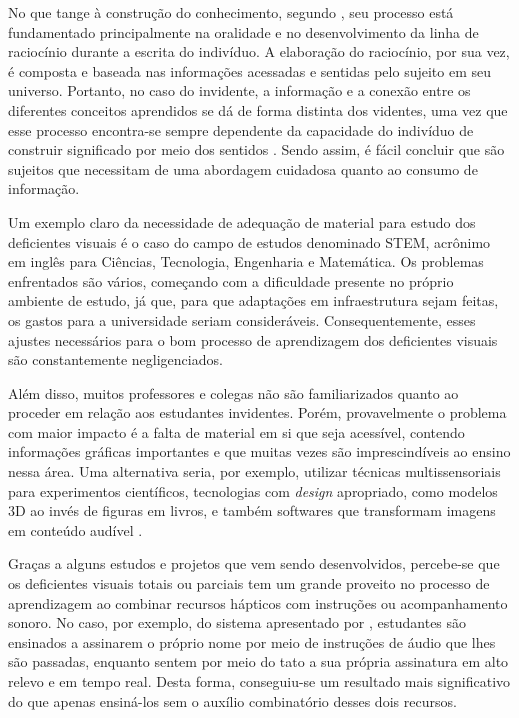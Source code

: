 No que tange à construção do conhecimento, segundo , seu processo está fundamentado principalmente na oralidade e no desenvolvimento da linha de raciocínio durante a escrita do indivíduo. A elaboração do raciocínio, por sua vez, é composta e baseada nas informações acessadas e sentidas pelo sujeito em seu universo. Portanto, no caso do invidente, a informação e a conexão entre os diferentes conceitos aprendidos se dá de forma distinta dos videntes, uma vez que esse processo encontra-se sempre dependente da capacidade do indivíduo de construir significado por meio dos sentidos . Sendo assim, é fácil concluir que são sujeitos que necessitam de uma abordagem cuidadosa quanto ao consumo de informação.

Um exemplo claro da necessidade de adequação de material para estudo dos deficientes visuais é o caso do campo de estudos denominado STEM, acrônimo em inglês para Ciências, Tecnologia, Engenharia e Matemática. Os problemas enfrentados são vários, começando com a dificuldade presente no próprio ambiente de estudo, já que, para que adaptações em infraestrutura sejam feitas, os gastos para a universidade seriam consideráveis. Consequentemente, esses ajustes necessários para o bom processo de aprendizagem dos deficientes visuais são constantemente negligenciados.

Além disso, muitos professores e colegas não são familiarizados quanto ao proceder em relação aos estudantes invidentes. Porém, provavelmente o problema com maior impacto é a falta de material em si que seja acessível, contendo informações gráficas importantes e que muitas vezes são imprescindíveis ao ensino nessa área. Uma alternativa seria, por exemplo, utilizar técnicas multissensoriais para experimentos científicos, tecnologias com \textit{design} apropriado, como modelos 3D ao invés de figuras em livros, e também softwares que transformam imagens em conteúdo audível .

Graças a alguns estudos e projetos que vem sendo desenvolvidos, percebe-se que os deficientes visuais totais ou parciais tem um grande proveito no processo de aprendizagem ao combinar recursos hápticos com instruções ou acompanhamento sonoro. No caso, por exemplo, do sistema apresentado por , estudantes são ensinados a assinarem o próprio nome por meio de instruções de áudio que lhes são passadas, enquanto sentem por meio do tato a sua própria assinatura em alto relevo e em tempo real. Desta forma, conseguiu-se um resultado mais significativo do que apenas ensiná-los sem o auxílio combinatório desses dois recursos.

